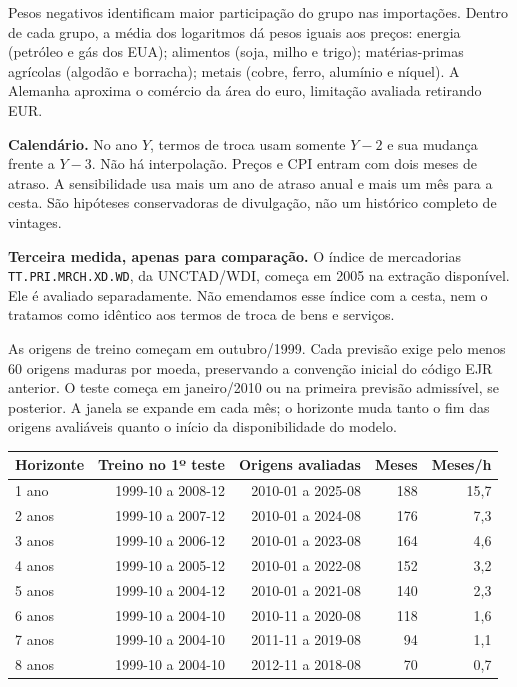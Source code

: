 \documentclass[10pt,a4paper]{article}
\newcommand{\pagina}[1]{\clearpage{\Large\bfseries\color{navy} #1}\par\vspace{6pt}}
\begin{document}
Pesos negativos identificam maior participação do grupo nas importações. Dentro de cada grupo, a média dos logaritmos dá pesos iguais aos preços: energia (petróleo e gás dos EUA); alimentos (soja, milho e trigo); matérias-primas agrícolas (algodão e borracha); metais (cobre, ferro, alumínio e níquel). A Alemanha aproxima o comércio da área do euro, limitação avaliada retirando EUR.

\textbf{Calendário.} No ano $Y$, termos de troca usam somente $Y-2$ e sua mudança frente a $Y-3$. Não há interpolação. Preços e CPI entram com dois meses de atraso. A sensibilidade usa mais um ano de atraso anual e mais um mês para a cesta. São hipóteses conservadoras de divulgação, não um histórico completo de vintages.

\textbf{Terceira medida, apenas para comparação.} O índice de mercadorias \texttt{TT.PRI.MRCH.XD.WD}, da UNCTAD/WDI, começa em 2005 na extração disponível. Ele é avaliado separadamente. Não emendamos esse índice com a cesta, nem o tratamos como idêntico aos termos de troca de bens e serviços.

\pagina{3. Treinamento e avaliação fora da amostra}
As origens de treino começam em outubro/1999. Cada previsão exige pelo menos 60 origens maduras por moeda, preservando a convenção inicial do código EJR anterior. O teste começa em janeiro/2010 ou na primeira previsão admissível, se posterior. A janela se expande em cada mês; o horizonte muda tanto o fim das origens avaliáveis quanto o início da disponibilidade do modelo.

{\footnotesize
\begin{center}\begin{tabular}{lrrrr}\toprule
Horizonte & Treino no 1º teste & Origens avaliadas & Meses & Meses/h \\ \midrule
1 ano & 1999-10 a 2008-12 & 2010-01 a 2025-08 & 188 & 15,7 \\
2 anos & 1999-10 a 2007-12 & 2010-01 a 2024-08 & 176 & 7,3 \\
3 anos & 1999-10 a 2006-12 & 2010-01 a 2023-08 & 164 & 4,6 \\
4 anos & 1999-10 a 2005-12 & 2010-01 a 2022-08 & 152 & 3,2 \\
5 anos & 1999-10 a 2004-12 & 2010-01 a 2021-08 & 140 & 2,3 \\
6 anos & 1999-10 a 2004-10 & 2010-11 a 2020-08 & 118 & 1,6 \\
7 anos & 1999-10 a 2004-10 & 2011-11 a 2019-08 & 94 & 1,1 \\
8 anos & 1999-10 a 2004-10 & 2012-11 a 2018-08 & 70 & 0,7 \\\bottomrule\end{tabular}\end{center}}
\end{document}

